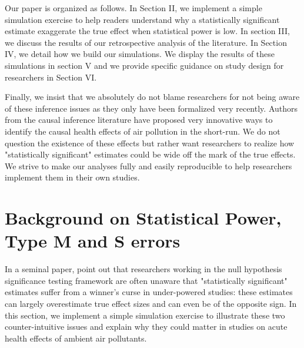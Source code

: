 \documentclass[12pt]{article}
\begin{document}
    Our paper is organized as follows. In Section II, we implement a simple simulation exercise to help readers understand why a statistically significant estimate exaggerate the true effect when statistical power is low. In section III, we discuss the results of our retrospective analysis of the literature. In Section IV, we detail how we build our simulations. We display the results of these simulations in section V and we provide specific guidance on study design for researchers in Section VI.
    
    Finally, we insist that we absolutely do not blame researchers for not being aware of these inference issues as they only have been formalized very recently. Authors from the causal inference literature have proposed very innovative ways to identify the causal health effects of air pollution in the short-run. We do not question the existence of these effects but rather want researchers to realize how "statistically significant" estimates could be wide off the mark of the true effects. We strive to make our analyses fully and easily reproducible to help researchers implement them in their own studies.




\section{Background on Statistical Power, Type M and S errors}\label{sec:background}

    In a seminal paper, \cite{gelman_beyond_2014} point out that researchers working in the null hypothesis significance testing framework are often unaware that "statistically significant" estimates suffer from a winner's curse in under-powered studies: these estimates can largely overestimate true effect sizes and can even be of the opposite sign. In this section, we implement a simple simulation exercise to illustrate these two counter-intuitive issues and explain why they could matter in studies on acute health effects of ambient air pollutants.
\end{document}
